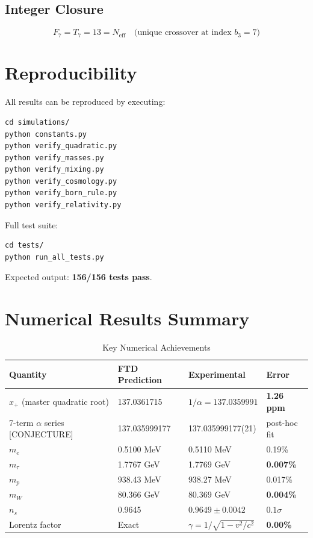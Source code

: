 \documentclass[11pt,a4paper]{article}
\begin{document}
\subsection{Integer Closure}
\begin{equation}
F_7 = T_7 = 13 = N_{\text{eff}} \quad \text{(unique crossover at index } b_3 = 7\text{)}
\end{equation}

\section{Reproducibility}

All results can be reproduced by executing:

\begin{verbatim}
cd simulations/
python constants.py
python verify_quadratic.py
python verify_masses.py
python verify_mixing.py
python verify_cosmology.py
python verify_born_rule.py
python verify_relativity.py
\end{verbatim}

Full test suite:
\begin{verbatim}
cd tests/
python run_all_tests.py
\end{verbatim}

Expected output: \textbf{156/156 tests pass}.

\section{Numerical Results Summary}

\begin{table}[H]
\centering
\caption{Key Numerical Achievements}
\begin{tabular}{llll}
\toprule
\textbf{Quantity} & \textbf{FTD Prediction} & \textbf{Experimental} & \textbf{Error} \\
\midrule
$x_+$ (master quadratic root) & 137.0361715 & $1/\alpha = 137.0359991$ & \textbf{1.26 ppm} \\
7-term $\alpha$ series [CONJECTURE] & 137.035999177 & 137.035999177(21) & post-hoc fit \\
$m_e$ & 0.5100 MeV & 0.5110 MeV & 0.19\% \\
$m_\tau$ & 1.7767 GeV & 1.7769 GeV & \textbf{0.007\%} \\
$m_p$ & 938.43 MeV & 938.27 MeV & 0.017\% \\
$m_W$ & 80.366 GeV & 80.369 GeV & \textbf{0.004\%} \\
$n_s$ & 0.9645 & $0.9649 \pm 0.0042$ & $0.1\sigma$ \\
Lorentz factor & Exact & $\gamma = 1/\sqrt{1-v^2/c^2}$ & \textbf{0.00\%} \\
\bottomrule
\end{tabular}
\end{table}
\end{document}
